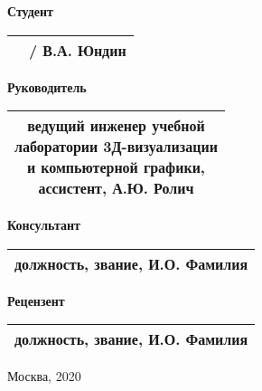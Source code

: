 \begin{multicols}{2}
    \noindent
    \textbf{Студент}
    
    \vspace{4mm}
    
    \noindent
    \begin{tabularx}{\linewidth}{Xc}
        & / В.А. Юндин \\
        \hline
    \end{tabularx}
    
    \columnbreak
    
    \noindent
    \textbf{Руководитель}
    
    \vspace{4mm}
    
    \noindent
    \begin{tabularx}{\linewidth}{c}
        \makecell[l]{ведущий инженер учебной \\ лаборатории 3Д-визуализации \\ и компьютерной графики, \\ ассистент, А.Ю. Ролич} \\
        \hline
    \end{tabularx}

    \vspace{8mm}

    \noindent
    \textbf{Консультант}
    
    \vspace{4mm}
    
    \noindent
    \begin{tabularx}{\linewidth}{c}
        должность, звание, И.О. Фамилия \\
        \hline
    \end{tabularx}

    \vspace{8mm}
    
    \noindent
    \textbf{Рецензент}
    
    \vspace{4mm}
    
    \noindent
    \begin{tabularx}{\linewidth}{c}
        должность, звание, И.О. Фамилия \\
        \hline
    \end{tabularx}
\end{multicols}

\vfill
\begin{center}Москва, 2020\end{center}

\restoregeometry
\newpage
